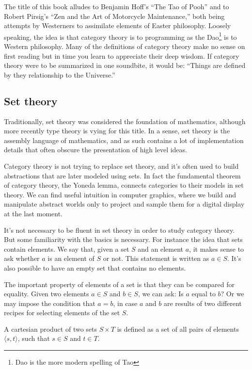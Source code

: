 \documentclass[11pt, book]{memoir}
\begin{document}
The title of this book alludes to Benjamin Hoff's ``The Tao of Pooh'' and to Robert Pirsig's ``Zen and the Art of Motorcycle Maintenance,'' both being attempts by Westerners to assimilate elements of Easter philosophy. Loosely speaking, the idea is that category theory is to programming as the Dao\footnote{Dao is the more modern spelling of Tao} is to Western philosophy. Many of the definitions of category theory make no sense on first reading but in time you learn to appreciate their deep wisdom. If category theory were to be summarized in one soundbite, it would be: ``Things are defined by they relationship to the Universe.'' 

\subsection{Set theory}

Traditionally, set theory was considered the foundation of mathematics, although more recently type theory is vying for this title. In a sense, set theory is the assembly language of mathematics, and as such contains a lot of implementation details that often obscure  the presentation of high level ideas. 

Category theory is not trying to replace set theory, and it's often used to build abstractions that are later modeled using sets. In fact the fundamental theorem of category theory, the Yoneda lemma, connects categories to their models in set theory. We can find useful intuition in computer graphics, where we build and manipulate abstract worlds only to project and sample them for a digital display at the last moment.

It's not necessary to be fluent in set theory in order to study category theory. But some familiarity with the basics is necessary. For instance the idea that sets contain elements. We say that, given a set $S$ and an element $a$, it makes sense to ask whether $a$ is an element of $S$ or not. This statement is written as $a \in S$. It's also possible to have an empty set that contains no elements. 

The important property of elements of a set is that they can be compared for equality. Given two elements $a \in S$ and $b \in S$, we can ask: Is $a$ equal to $b$? Or we may impose the condition that $a = b$, in case $a$ and $b$ are results of two different recipes for selecting elements of the set $S$.

A cartesian product of two sets $S \times T$ is defined as a set of all pairs of elements $\langle s, t\rangle$, such that $s \in S$ and $t \in T$.
\end{document}
